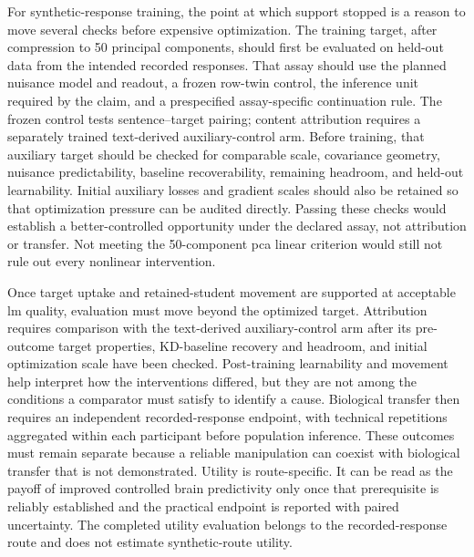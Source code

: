 For synthetic-response training, the point at which support stopped is a reason to move several checks before expensive optimization.
The training target, after compression to 50 principal components, should first be evaluated on held-out data from the intended recorded responses.
That assay should use the planned nuisance model and readout, a frozen row-twin control, the inference unit required by the claim, and a prespecified assay-specific continuation rule.
The frozen control tests sentence--target pairing; content attribution requires a separately trained text-derived auxiliary-control arm.
Before training, that auxiliary target should be checked for comparable scale, covariance geometry, nuisance predictability, baseline recoverability, remaining headroom, and held-out learnability.
Initial auxiliary losses and gradient scales should also be retained so that optimization pressure can be audited directly.
Passing these checks would establish a better-controlled opportunity under the declared assay, not attribution or transfer.
Not meeting the 50-component \ac{pca} linear criterion would still not rule out every nonlinear intervention.

Once target uptake and retained-student movement are supported at acceptable \ac{lm} quality, evaluation must move beyond the optimized target.
Attribution requires comparison with the text-derived auxiliary-control arm after its pre-outcome target properties, KD-baseline recovery and headroom, and initial optimization scale have been checked.
Post-training learnability and movement help interpret how the interventions differed, but they are not among the conditions a comparator must satisfy to identify a cause.
Biological transfer then requires an independent recorded-response endpoint, with technical repetitions aggregated within each participant before population inference.
These outcomes must remain separate because a reliable manipulation can coexist with biological transfer that is not demonstrated.
Utility is route-specific.
It can be read as the payoff of improved controlled brain predictivity only once that prerequisite is reliably established and the practical endpoint is reported with paired uncertainty.
The completed utility evaluation belongs to the recorded-response route and does not estimate synthetic-route utility.

